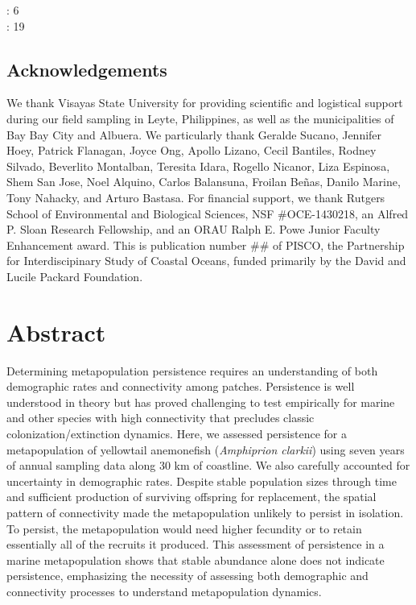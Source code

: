 \documentclass[12pt, oneside]{article}   	%
\begin{document}
: 6 \\ 

: 19 \\ 

\subsection*{Acknowledgements}
We thank Visayas State University for providing scientific and logistical support during our field sampling in Leyte, Philippines, as well as the municipalities of Bay Bay City and Albuera. We particularly thank Geralde Sucano, Jennifer Hoey, Patrick Flanagan, Joyce Ong, Apollo Lizano, Cecil Bantiles, Rodney Silvado, Beverlito Montalban, Teresita Idara, Rogello Nicanor, Liza Espinosa, Shem San Jose, Noel Alquino, Carlos Balansuna, Froilan Beñas, Danilo Marine, Tony Nahacky, and Arturo Bastasa. For financial support, we thank Rutgers School of Environmental and Biological Sciences, NSF \#OCE-1430218, an Alfred P. Sloan Research Fellowship, and an ORAU Ralph E. Powe Junior Faculty Enhancement award. This is publication number \#\# of PISCO, the Partnership for Interdiscipinary Study of Coastal Oceans, funded primarily by the David and Lucile Packard Foundation.

\bigskip

\section*{Abstract}
Determining metapopulation persistence requires an understanding of both demographic rates and connectivity among patches. Persistence is well understood in theory but has proved challenging to test empirically for marine and other species with high connectivity that precludes classic colonization/extinction dynamics. Here, we assessed persistence for a metapopulation of yellowtail anemonefish (\textit{Amphiprion clarkii}) using seven years of annual sampling data along 30 km of coastline. We also carefully accounted for uncertainty in demographic rates. Despite stable population sizes through time and sufficient production of surviving offspring for replacement, the spatial pattern of connectivity made the metapopulation unlikely to persist in isolation. To persist, the metapopulation would need higher fecundity or to retain essentially all of the recruits it produced. This assessment of persistence in a marine metapopulation shows that stable abundance alone does not indicate persistence, emphasizing the necessity of assessing both demographic and connectivity processes to understand metapopulation dynamics. 
\end{document}
